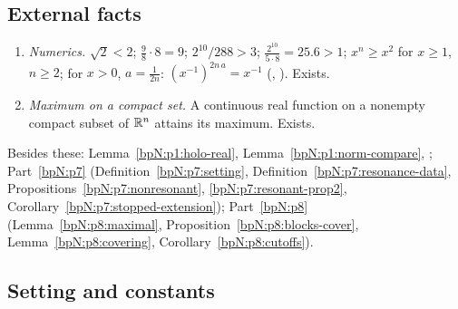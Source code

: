 \subsection{External facts}\label{bpN:p9:s-ext}
\begin{enumerate}[label=(E\arabic*),leftmargin=2.2em]
\item\label{bpN:p9:ext-num} \emph{Numerics.} $\sqrt2<2$; $\frac98\cdot8=9$; $2^{10}/288>3$; $\frac{2^{10}}{5\cdot8}=25.6>1$; $x^n\ge x^2$ for $x\ge1$, $n\ge2$; for $x>0$, $a=\frac1{2n}$: $(x^{-1})^{2n\,a}=x^{-1}$ (, ). Exists.
\item\label{bpN:p9:ext-compact} \emph{Maximum on a compact set.} A continuous real function on a nonempty compact subset of $\mathbb{R}^n$ attains its maximum. Exists.
\end{enumerate}
Besides these: Lemma~\ref{bpN:p1:holo-real}, Lemma~\ref{bpN:p1:norm-compare}, ; Part~\ref{bpN:p7} (Definition~\ref{bpN:p7:setting}, Definition~\ref{bpN:p7:resonance-data}, Propositions~\ref{bpN:p7:nonresonant}, \ref{bpN:p7:resonant-prop2}, Corollary~\ref{bpN:p7:stopped-extension}); Part~\ref{bpN:p8} (Lemma~\ref{bpN:p8:maximal}, Proposition~\ref{bpN:p8:blocks-cover}, Lemma~\ref{bpN:p8:covering}, Corollary~\ref{bpN:p8:cutoffs}).

\subsection{Setting and constants}\label{bpN:p9:s-setting}

